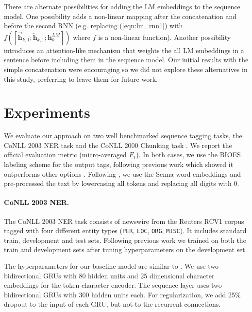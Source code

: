 \documentclass[11pt,a4paper]{article}
\begin{document}
There are alternate possibilities for adding the LM embeddings to the sequence model.  One possibility adds a non-linear mapping after the concatenation and before the second RNN (e.g. replacing (\ref{eqn:lm_rnn1}) with $f([\overrightarrow{\mathbf{h}}_{k,1}; \overleftarrow{\mathbf{h}}_{k,1}; \mathbf{h}_k^{LM}])$ where $f$ is a non-linear function). Another possibility introduces an attention-like mechanism that weights the all LM embeddings in a sentence before including them in the sequence model.  
Our initial results with the simple concatenation were encouraging so we did not explore these alternatives in this study, preferring to leave them for future work.






\section{Experiments}

We evaluate our approach on two well benchmarked sequence tagging tasks,
the CoNLL 2003 NER task \citep{CoNLL2003NER} and the CoNLL 2000 Chunking task
\citep{CoNLL2000Chunking}.
We report the official evaluation metric
(micro-averaged $F_1$).  In both cases, we use
the BIOES labeling scheme for the output tags,
following previous work which showed it outperforms other options
\citep[e.g.,][]{Ratinov2009DesignCA}.
Following \citet{chiu-nichols-2016}, we use the Senna word embeddings \citep{NLPfromScratch:Collobert2011} and pre-processed the text by
lowercasing all tokens and replacing all digits with 0. 

\paragraph{CoNLL 2003 NER.}
The CoNLL 2003 NER task consists of newswire from the Reuters RCV1 corpus tagged with four
different entity types (\texttt{PER}, \texttt{LOC}, \texttt{ORG}, \texttt{MISC}).  It includes
standard train, development and test sets.  Following previous work \citep{yang-transfer-iclr07,chiu-nichols-2016} we trained on both the train and development sets after tuning hyperparameters on the development set. 

The hyperparameters for our baseline model are similar to \citet{yang-transfer-iclr07}.
We use two bidirectional GRUs with 80 hidden units and 25 dimensional character embeddings for the token character
encoder.  The sequence layer uses two bidirectional GRUs with 300 hidden units each.  For regularization, we add
25\% dropout to the input of each GRU, but not to the recurrent connections.
\end{document}
